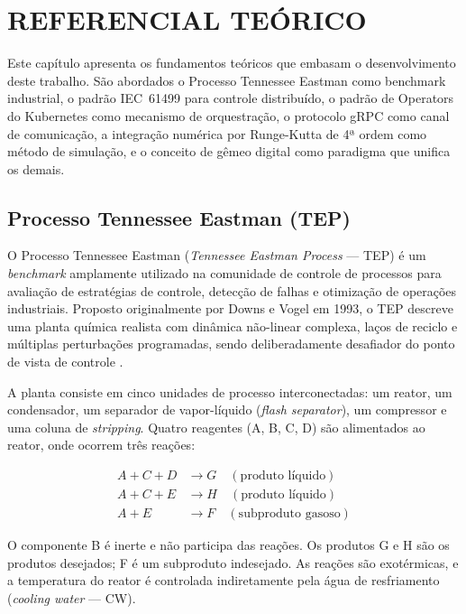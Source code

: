 \chapter[REFERENCIAL TEÓRICO]{REFERENCIAL TEÓRICO}
\label{cha:referencial}

Este capítulo apresenta os fundamentos teóricos que embasam o desenvolvimento deste trabalho. São abordados o Processo Tennessee Eastman como benchmark industrial, o padrão IEC~61499 para controle distribuído, o padrão de Operators do Kubernetes como mecanismo de orquestração, o protocolo gRPC como canal de comunicação, a integração numérica por Runge-Kutta de 4ª ordem como método de simulação, e o conceito de gêmeo digital como paradigma que unifica os demais.

\section{Processo Tennessee Eastman (TEP)}
\label{sec:tep}

O Processo Tennessee Eastman (\textit{Tennessee Eastman Process} — TEP) é um \textit{benchmark} amplamente utilizado na comunidade de controle de processos para avaliação de estratégias de controle, detecção de falhas e otimização de operações industriais. Proposto originalmente por Downs e Vogel em 1993, o TEP descreve uma planta química realista com dinâmica não-linear complexa, laços de reciclo e múltiplas perturbações programadas, sendo deliberadamente desafiador do ponto de vista de controle \cite{DOWNS1993}.

A planta consiste em cinco unidades de processo interconectadas: um reator, um condensador, um separador de vapor-líquido (\textit{flash separator}), um compressor e uma coluna de \textit{stripping}. Quatro reagentes (A, B, C, D) são alimentados ao reator, onde ocorrem três reações:

\begin{align}
  A + C + D &\rightarrow G \quad (\text{produto líquido}) \label{eq:rx1} \\
  A + C + E &\rightarrow H \quad (\text{produto líquido}) \label{eq:rx2} \\
  A + E     &\rightarrow F \quad (\text{subproduto gasoso}) \label{eq:rx3}
\end{align}

O componente B é inerte e não participa das reações. Os produtos G e H são os produtos desejados; F é um subproduto indesejado. As reações são exotérmicas, e a temperatura do reator é controlada indiretamente pela água de resfriamento (\textit{cooling water} — CW).

